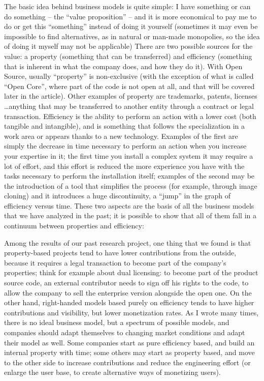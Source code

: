 The basic idea behind business models is quite simple: I have something or can
do something -- the ``value proposition'' -- and it is more economical to pay me to
do or get this ``something'' instead of doing it yourself (sometimes it may even
be impossible to find alternatives, as in natural or man-made monopolies, so the
idea of doing it myself may not be applicable)
There are two possible sources for the value: a property (something that can be
transferred) and efficiency (something that is inherent in what the company does,
and how they do it). With Open Source, usually ``property'' is non-exclusive (with
the exception of what is called ``Open Core'', where part of the code is not open
at all, and that will be covered later in the article). Other examples of
property are trademarks, patents, licenses \dots anything that may be
transferred to another entity through a contract or legal transaction.
Efficiency is the ability to perform an action with a lower cost (both tangible
and intangible), and is something that follows the specialization in a work area
or appears thanks to a new technology. Examples of the first are simply the
decrease in time necessary to perform an action when you increase your expertise
in it; the first time you install a complex system it may require a lot of effort,
and this effort is reduced the more experience you have with the tasks necessary to
perform the installation itself; examples of the second may be the introduction
of a tool that simplifies the process (for example, through image cloning) and
it introduces a huge discontinuity, a ``jump'' in the graph of efficiency versus
time.
These two aspects are the basis of all the business models that we have analyzed
in the past; it is possible to show that all of them fall in a continuum between
properties and efficiency:

Among the results of our past research project, one thing that we found is that
property-based projects tend to have lower contributions from the outside,
because it requires a legal transaction to become part of the company’s
properties; think for example about dual licensing: to become part of the product
source code, an external contributor needs to sign off his rights to the code,
to allow the company to sell the enterprise version alongside the open one.
On the other hand, right-handed models based purely on efficiency tends to have
higher contributions and visibility, but lower monetization rates. As I wrote
many times, there is no ideal business model, but a spectrum of possible models,
and companies should adapt themselves to changing market conditions and adapt
their model as well. Some companies start as pure efficiency based, and build an
internal property with time; some others may start as property based, and move
to the other side to increase contributions and reduce the engineering effort
(or enlarge the user base, to create alternative ways of monetizing users).

